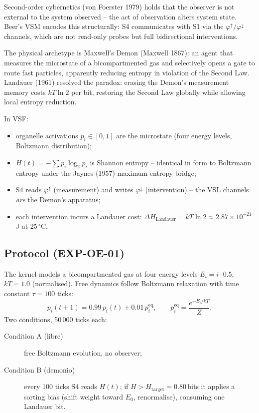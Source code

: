 \documentclass[11pt, a4paper]{article}
\begin{document}
Second-order cybernetics (von Foerster 1979) holds that the observer is not
external to the system observed -- the act of observation alters system state.
Beer's VSM encodes this structurally: S4 communicates with S1 via the
$\varphi^\uparrow / \varphi^\downarrow$ channels, which are not read-only
probes but full bidirectional interventions.

The physical archetype is Maxwell's Demon (Maxwell 1867): an agent that
measures the microstate of a bicompartmented gas and selectively opens a gate
to route fast particles, apparently reducing entropy in violation of the Second
Law.  Landauer (1961) resolved the paradox: erasing the Demon's measurement
memory costs $kT \ln 2$ per bit, restoring the Second Law globally while
allowing local entropy reduction.

In VSF:
\begin{itemize}
  \item organelle activations $p_i \in [0,1]$ are the microstate (four energy
    levels, Boltzmann distribution);
  \item $H(t) = -\sum p_i \log_2 p_i$ is Shannon entropy -- identical in form
    to Boltzmann entropy under the Jaynes (1957) maximum-entropy bridge;
  \item S4 reads $\varphi^\uparrow$ (measurement) and writes $\varphi^\downarrow$
    (intervention) -- the VSL channels \emph{are} the Demon's apparatus;
  \item each intervention incurs a Landauer cost: $\Delta H_\text{Landauer} =
    kT \ln 2 \approx 2.87 \times 10^{-21}$\,J at 25\,$^\circ$C.
\end{itemize}

\subsection{Protocol (EXP-OE-01)}

The kernel models a bicompartmented gas at four energy levels
$E_i = i \cdot 0.5$, $kT = 1.0$ (normalised).  Free dynamics follow
Boltzmann relaxation with time constant $\tau = 100$ ticks:
\[
  p_i(t+1) = 0.99\,p_i(t) + 0.01\,p_i^\text{eq},
  \qquad p_i^\text{eq} = \frac{e^{-E_i/kT}}{Z}.
\]
Two conditions, 50\,000 ticks each:
\begin{description}
  \item[Condition A (libre)] free Boltzmann evolution, no observer;
  \item[Condition B (demonio)] every 100 ticks S4 reads $H(t)$; if
    $H > H_\text{target} = 0.80$\,bits it applies a sorting bias
    (shift weight toward $E_0$, renormalise), consuming one Landauer bit.
\end{description}
\end{document}
